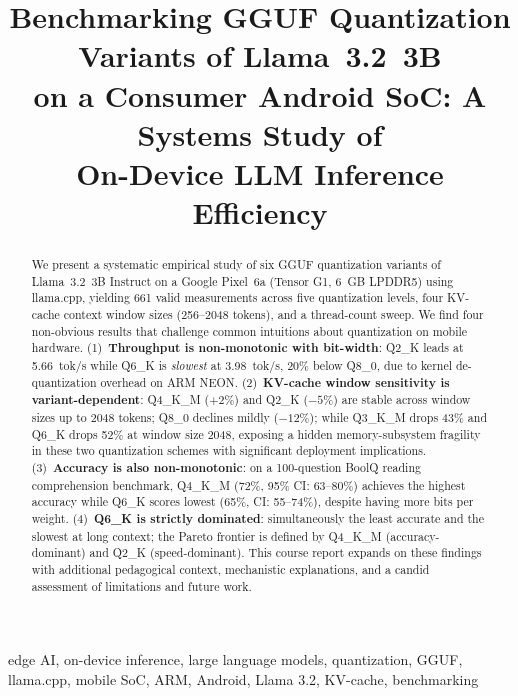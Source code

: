 \documentclass[conference]{IEEEtran}
\begin{document}
\title{Benchmarking GGUF Quantization Variants of Llama~3.2~3B\\
on a Consumer Android SoC: A Systems Study of\\
On-Device LLM Inference Efficiency}

\author{
}

\maketitle

\begin{abstract}
We present a systematic empirical study of six GGUF quantization variants of
Llama~3.2~3B Instruct on a Google Pixel~6a (Tensor G1, 6~GB LPDDR5) using
llama.cpp, yielding 661 valid measurements across five quantization levels, four
KV-cache context window sizes (256--2048 tokens), and a thread-count sweep.
We find four non-obvious results that challenge common intuitions about quantization
on mobile hardware.
(1)~\textbf{Throughput is non-monotonic with bit-width}: Q2\_K leads at 5.66~tok/s
while Q6\_K is \emph{slowest} at 3.98~tok/s, 20\% below Q8\_0, due to kernel
de-quantization overhead on ARM NEON.
(2)~\textbf{KV-cache window sensitivity is variant-dependent}: Q4\_K\_M ($+2\%$)
and Q2\_K ($-5\%$) are stable across window sizes up to 2048 tokens; Q8\_0 declines
mildly ($-12\%$); while Q3\_K\_M drops 43\% and Q6\_K drops 52\% at window size
2048, exposing a hidden memory-subsystem fragility in these two quantization schemes
with significant deployment implications.
(3)~\textbf{Accuracy is also non-monotonic}: on a 100-question BoolQ reading
comprehension benchmark, Q4\_K\_M (72\%, 95\% CI: 63--80\%) achieves the highest
accuracy while Q6\_K scores lowest (65\%, CI: 55--74\%), despite having more bits
per weight.
(4)~\textbf{Q6\_K is strictly dominated}: simultaneously the least accurate
and the slowest at long context; the Pareto frontier is defined by Q4\_K\_M
(accuracy-dominant) and Q2\_K (speed-dominant).
This course report expands on these findings with additional pedagogical context,
mechanistic explanations, and a candid assessment of limitations and future work.
\end{abstract}

\begin{IEEEkeywords}
edge AI, on-device inference, large language models, quantization, GGUF,
llama.cpp, mobile SoC, ARM, Android, Llama 3.2, KV-cache, benchmarking
\end{IEEEkeywords}
\end{document}
